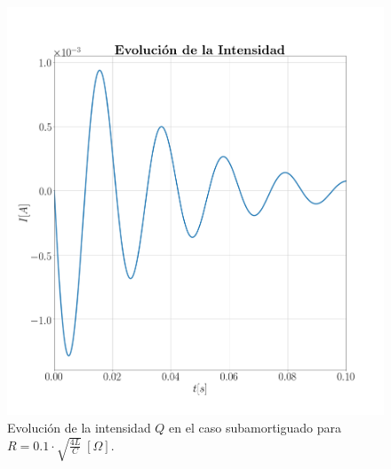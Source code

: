 \documentclass[journal]{IEEEtran}
\begin{document}
\begin{figure}[!htb]
    \centering
    \includegraphics[width=\linewidth,trim={40 70 70 70},clip]{intensidadsubamortiguado.png}
    \caption{Evolución de la intensidad $Q$ en el caso subamortiguado para $R=0.1 \cdot\sqrt{\frac{4L}{C}}~[\Omega]$.}
    \label{fig:intensidadamortiguado}
\end{figure}
\end{document}

